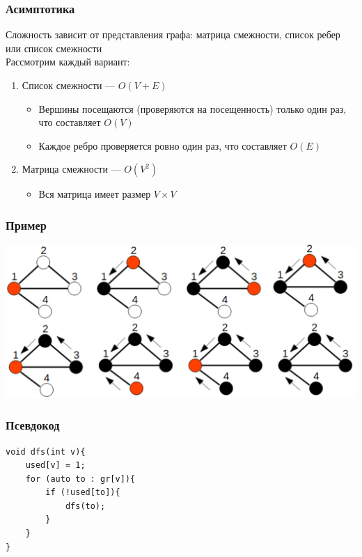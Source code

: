 \documentclass[a4paper]{article}
\begin{document}
\subsubsection*{Асимптотика}
\label{dfs_asimp}
Сложность зависит от представления графа: матрица смежности, список ребер или список смежности\\[2mm]
\indent Рассмотрим каждый вариант:
\begin{enumerate}
    \item Список смежности — $O(V+E)$
    \begin{itemize}
        \item Вершины посещаются (проверяются на посещенность) только один раз, что составляет $O(V)$
        \item Каждое ребро проверяется ровно один раз, что составляет $O(E)$
    \end{itemize}
    \item Матрица смежности — $O(V^2)$
    \begin{itemize}
        \item Вся матрица имеет размер $V\times V$
    \end{itemize}
\end{enumerate}
\subsubsection*{Пример}
\begin{center}
    \includegraphics[width=0.8\linewidth]{dfs.png}
    \label{dfs}
\end{center}
\subsubsection*{Псевдокод}
\begin{lstlisting}
void dfs(int v){
    used[v] = 1;
    for (auto to : gr[v]){
        if (!used[to]){
            dfs(to);
        }
    }
}
\end{lstlisting}
\end{document}
